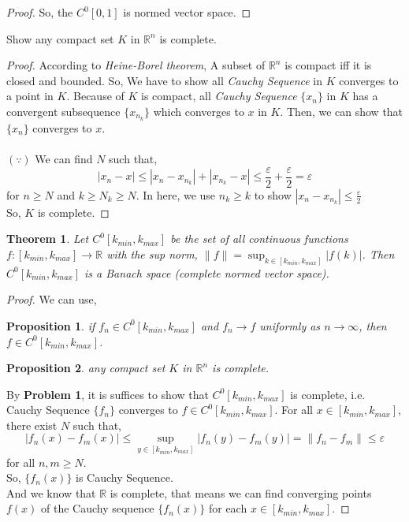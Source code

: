 \documentclass[a4paper, 10pt]{article}
\newcommand{\R}{\mathbb{R}}
\newtheorem{thm}{Theorem}
\newtheorem{prop}{Proposition}
\theoremstyle{definition}
\begin{document}
\begin{description}
\begin{proof}
		So, the  $ C^0[0,1] $ is normed vector space.
		\end{proof}


	\item[Problem 2. (\textbf{Proposition 2})] Show any compact set $K$ in $\R^n$ is complete. 
		\begin{proof}
		
		According to \textit{Heine-Borel theorem}, A subset of $\R^n$ is compact iff it is closed and bounded.
		So, We have to show all \textit{Cauchy Sequence} in $K$ converges to a point in $K$. 
		Because of $K$ is compact, all \textit{Cauchy Sequence} $\{x_n\}$ in $K$ has a convergent subsequence $\{x_{n_k}\}$ which converges to $x$ in $K$. Then, we can show that $\{x_n\}$ converges to $x$.\\
		\\
		 $(\because)$ We can find $N$ such that,
		\begin{displaymath}
			|x_n - x| \leq |x_n - x_{n_k}| + |x_{n_k} - x| \leq \frac{\varepsilon}{2} + \frac{\varepsilon}{2} =\varepsilon
		\end{displaymath}
		 for $ n \geq N$ and $ k \geq N_k \geq N$. In here, we use $n_k \geq k$ to show $ |x_n - x_{n_k}| \leq \frac{\varepsilon}{2}$ \\
		So, $K$ is complete.
		\end{proof}

	\item[Problem 3. (Proof of \textbf{Theorem 1})]

		\begin{thm}
			Let $ C^0 [k_{min}, k_{max}]$ be the set of all continuous functions $ f: [k_{min}, k_{max}] \rightarrow \R$ with the sup norm, $ \|f\| = \sup_{k\in[k_{min}, k_{max}]} |f(k)|$. Then $C^0 [k_{min}, k_{max}]$ is a Banach space (complete normed vector space). 
		\end{thm}
		
		\begin{proof}
		We can use,
			\begin{prop}\label{prop_1}
				if $f_n \in C^0 [k_{min}, k_{max}]$ and $f_n \rightarrow f$ uniformly as $ n \rightarrow \infty$, then $f \in C^0[k_{min}, k_{max}]$.
			\end{prop}
			\begin{prop}\label{prop_2}
				any compact set $K$ in $\R^n$ is complete.
			\end{prop}
		By \textbf{Problem 1}, it is suffices to show that $ C^0[k_{min},k_{max}]$ is complete, i.e. Cauchy Sequence $\{f_n\}$ converges to $f \in C^0[k_{min},k_{max}]$.
		For all $x \in [k_{min}, k_{max}]$, there exist $N$ such that,
		\begin{displaymath}
			|f_n(x) - f_m(x)| \leq \sup_{y \in [k_{min}, k_{max}]} |f_n(y) - f_m(y)| = \|f_n - f_m \| \leq \varepsilon
		\end{displaymath}
		for all $n, m \geq N$.\\
		So, $\{f_n(x)\}$ is Cauchy Sequence.\\
		 And we know that $\R$ is complete, that means we can find converging points $f(x)$  of the Cauchy sequence $\{f_n(x)\}$ for each $x \in [k_{min}, k_{max}]$.
		

\end{proof}
\end{description}
\end{document}
